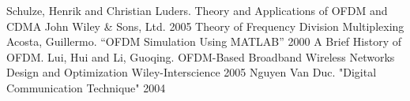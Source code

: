 \documentclass{article} %
\begin{document}
 

% 

\tableofcontents 
\thispagestyle{empty}
\cleardoublepage

 

{\let\oldnumberline\numberline
\renewcommand{\numberline}{Figure~\oldnumberline}
\listoffigures} 
\newpage

{\let\oldnumberline\numberline
\renewcommand{\numberline}{Table~\oldnumberline}
\listoftables}
\newpage

% 

 



\newpage

\newpage

\newpage

\newpage

\newpage



% 
% 
\begin{thebibliography}{00}
 Schulze, Henrik and Christian Luders. Theory and Applications of OFDM and CDMA John Wiley \& Sons, Ltd. 2005
 Theory of Frequency Division Multiplexing
 Acosta, Guillermo. “OFDM Simulation Using MATLAB” 2000
 A Brief History of OFDM.
 Lui, Hui and Li, Guoqing. OFDM-Based Broadband Wireless Networks Design and Optimization Wiley-Interscience 2005
 Nguyen Van Duc. "Digital Communication Technique" 2004

\end{thebibliography}

\newpage

\end{document}
